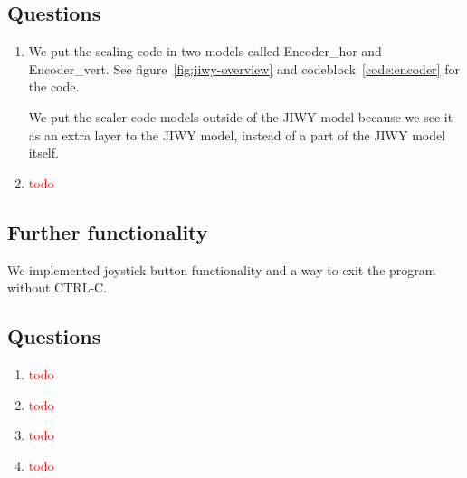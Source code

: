 \documentclass[a4paper,twoside,11pt]{article}
\newcommand{\todo}[1]{{\Large\sc\textcolor{red}{#1}}}
\begin{document}
\subsection{Questions}
\begin{enumerate}
	\item We put the scaling code in two models called Encoder\_hor and 
		Encoder\_vert. See figure~\ref{fig:jiwy-overview} and codeblock~\ref{code:encoder} for the code.

		We put the scaler-code models outside of the JIWY model because we see it as an extra layer to the JIWY model, instead of a part of the JIWY model itself.
	\item \todo{todo}
\end{enumerate}

\subsection{Further functionality}
We implemented joystick button functionality and a way to exit the program without CTRL-C.

\subsection{Questions}
\begin{enumerate}
	\item \todo{todo}
	\item \todo{todo}
	\item \todo{todo}
	\item \todo{todo}
\end{enumerate}
\end{document}

